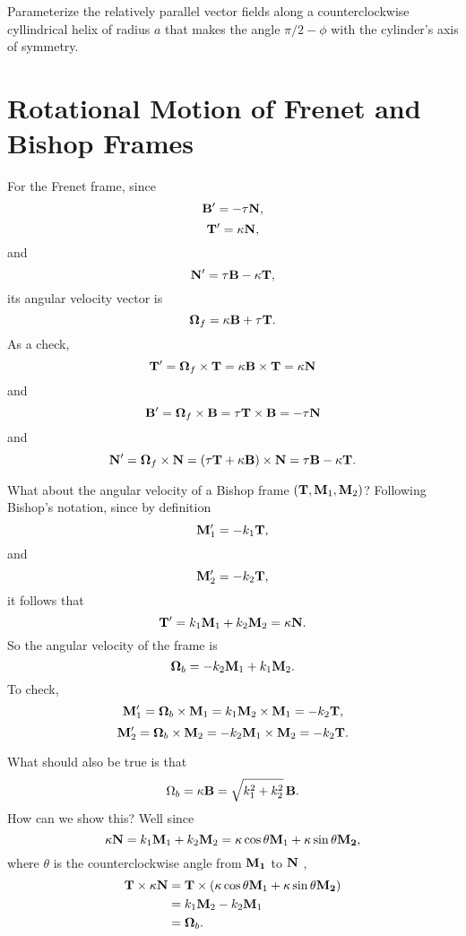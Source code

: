 \documentclass{ximera}
\begin{document}
\begin{exercise}  \label{E:MDnfddd}
Parameterize the relatively parallel vector fields along a counterclockwise cyllindrical helix of radius $a$ that makes the angle $\pi/2 - \phi$ with the cylinder's axis of symmetry.
\end{exercise}


\section*{Rotational Motion of Frenet and Bishop Frames}
For the Frenet frame, since
\[
      {\bf B}^\prime = -\tau {\bf N} ,
\]
\[
   {\bf T}^\prime = \kappa {\bf N},
\]
and
\[
   {\bf N}^\prime = \tau {\bf B} -\kappa {\bf T}  ,
\]
its angular velocity vector is 
\[
  \boldsymbol{\Omega}_f =   \kappa {\bf B} + \tau {\bf T}  .
\]
As a check, 
\[
    {\bf T}^\prime =    \boldsymbol{\Omega}_f \times {\bf T} = \kappa {\bf B} \times {\bf T} = \kappa {\bf N} 
\]
and 
\[
    {\bf B}^\prime =    \boldsymbol{\Omega}_f \times {\bf B} = \tau {\bf T} \times {\bf B} = - \tau {\bf N} 
\]
and
\[
    {\bf N}^\prime =    \boldsymbol{\Omega}_f \times {\bf N} =  (\tau {\bf T} + \kappa {\bf B})\times {\bf N} = \tau {\bf B}-\kappa{\bf T} .
\]

What about the angular velocity of a Bishop frame $({\bf T}, {\bf M}_1, {\bf M}_2)$? Following Bishop's notation, since by definition
\[
     {\bf M}_1^\prime = -k_1 {\bf T} , 
\]
and
\[
   {\bf M}_2^\prime = -k_2 {\bf T} , 
\]
it follows that
\[
   {\bf T}^\prime  = k_1 {\bf M}_1 + k_2 {\bf M}_2 = \kappa {\bf N} .
\]
So the angular velocity of the frame is
\[
  \boldsymbol{\Omega}_b = -k_2 {\bf M}_1 + k_1{\bf M}_2 .
\]
To check,
\[
    {\bf M}_1^\prime = \boldsymbol{\Omega}_b \times {\bf M}_1 = k_1 {\bf M}_2 \times {\bf M}_1 = - k_2 {\bf T} ,
\]
\[
    {\bf M}_2^\prime = \boldsymbol{\Omega}_b \times {\bf M}_2 = -k_2 {\bf M}_1 \times {\bf M}_2 = - k_2 {\bf T}.
\]

What should also be true is that
\[
        \Omega_b = \kappa {\bf B} = \sqrt{k_1^2 + k_2^2} \, {\bf B} .
\]
How can we show this? Well since
\[
   \kappa {\bf N} =  k_1 {\bf M}_1 + k_2 {\bf M}_2 = \kappa \cos \theta {\bf M}_1 + \kappa \sin\theta {\bf M_2} ,
\]
where $\theta$ is the counterclockwise angle from ${\bf M_1}$ to ${\bf N}$ ,
\begin{align*}
     {\bf T}\times \kappa {\bf N} &= {\bf T} \times  (  \kappa \cos \theta {\bf M}_1 + \kappa \sin\theta {\bf M_2}   ) \\
                                   &= k_1 {\bf M}_2 - k_2 {\bf M}_1 \\
                                   &= \boldsymbol{\Omega}_b.
\end{align*}
\end{document}
